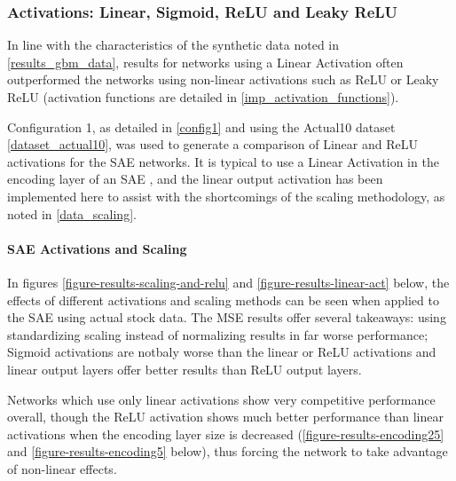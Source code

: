 \documentclass[a4paper,latin]{paper}
\begin{document}
\subsubsection{Activations: Linear, Sigmoid, ReLU and Leaky ReLU}

In line with the characteristics of the synthetic data noted in \ref{results_gbm_data}, results for networks using a Linear Activation often outperformed the networks using non-linear activations such as ReLU or Leaky ReLU (activation functions are detailed in \ref{imp_activation_functions}).

Configuration 1, as detailed in \ref{config1} and using the Actual10 dataset \ref{dataset_actual10}, was used to generate a comparison of Linear and ReLU activations for the SAE networks. It is typical to use a Linear Activation in the encoding layer of an SAE \cite{Hinton2}, and the linear output activation has been implemented here to assist with the shortcomings of the scaling methodology, as noted in \ref{data_scaling}.

\paragraph{SAE Activations and Scaling}\label{results_sae_activations_scaling}

In figures \ref{figure-results-scaling-and-relu} and \ref{figure-results-linear-act} below, the effects of different activations and scaling methods can be seen when applied to the SAE using actual stock data. The MSE results offer several takeaways: using standardizing scaling instead of normalizing results in far worse performance; Sigmoid activations are notbaly worse than the linear or ReLU activations and linear output layers offer better results than ReLU output layers. \newline

 Networks which use only linear activations show very competitive performance overall, though the ReLU activation shows much better performance than linear activations when the encoding layer size is decreased (\ref{figure-results-encoding25} and \ref{figure-results-encoding5} below), thus forcing the network to take advantage of non-linear effects.\newline

\end{document}
